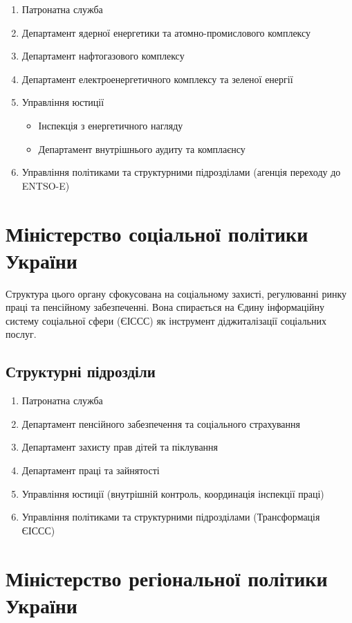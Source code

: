 \begin{enumerate}
    \item Патронатна служба
    \item Департамент ядерної енергетики та атомно-промислового комплексу
    \item Департамент нафтогазового комплексу
    \item Департамент електроенергетичного комплексу та зеленої енергії
    \item Управління юстиції
    \begin{itemize}
        \item Інспекція з енергетичного нагляду
        \item Департамент внутрішнього аудиту та комплаєнсу
    \end{itemize}
    \item Управління політиками та структурними підрозділами (агенція переходу до ENTSO-E)
\end{enumerate}

\newpage
\section{Міністерство соціальної політики України}

Структура цього органу сфокусована на соціальному захисті, регулюванні ринку праці та пенсійному забезпеченні. Вона спирається на Єдину інформаційну систему соціальної сфери (ЄІССС) як інструмент діджиталізації соціальних послуг.

\subsection*{Структурні підрозділи}

\begin{enumerate}
    \item Патронатна служба
    \item Департамент пенсійного забезпечення та соціального страхування
    \item Департамент захисту прав дітей та піклування
    \item Департамент праці та зайнятості
    \item Управління юстиції (внутрішній контроль, координація інспекції праці)
    \item Управління політиками та структурними підрозділами (Трансформація ЄІССС)
\end{enumerate}

\newpage
\section{Міністерство регіональної політики України}

